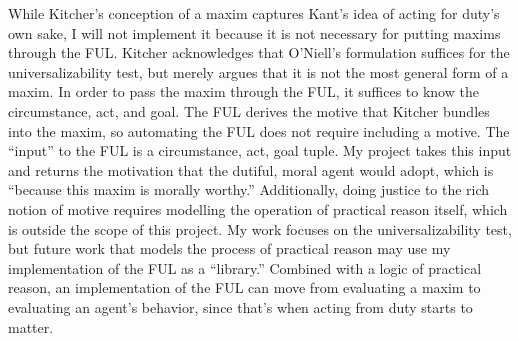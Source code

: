 \begin{isabellebody}
\begin{isamarkuptext}
While Kitcher's conception of a maxim captures Kant's idea of acting for duty's own sake, I will not implement it 
because it is not necessary for putting maxims through the FUL. Kitcher acknowledges that 
O'Niell's formulation suffices for the universalizability test, but merely argues that it is not the most general form of a maxim.
In order to pass the maxim through the FUL, it suffices to know the circumstance, act, and goal. The FUL
derives the motive that Kitcher bundles into the maxim, so automating the FUL does not require 
including a motive. The ``input'' to the FUL is a circumstance, act, goal tuple. My project takes 
this input and returns the motivation that the dutiful, moral agent would adopt, which is ``because this
maxim is morally worthy.'' Additionally, doing
justice to the rich notion of motive requires modelling the operation of practical reason itself, 
which is outside the scope of this project. My work focuses on the universalizability test, but future work that 
models the process of practical reason may use my implementation of the FUL as a ``library.'' Combined 
with a logic of practical reason, an implementation of the FUL can move from evaluating a maxim to 
evaluating an agent's behavior, since that's when acting from duty starts to matter.


\end{isamarkuptext}
\end{isabellebody}
